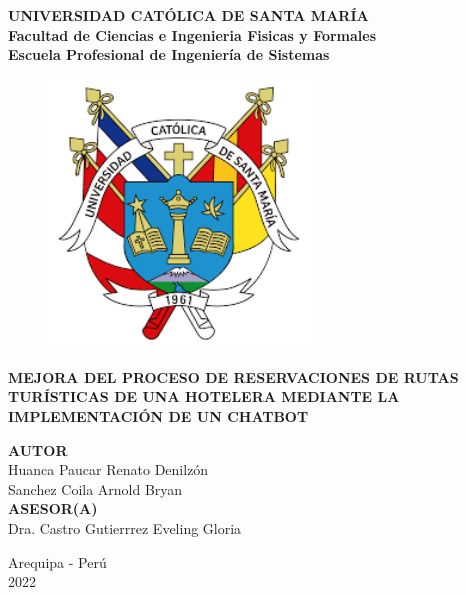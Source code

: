 \documentclass[12pt,a4paper,oneside]{article}
\begin{document}
\renewcommand{\BOthers}[1]{et al.\hbox{}}
\renewcommand\bibname{Bibliografía}

\marginsize{2.0cm}{2.0cm}{2.0cm}{2.0cm}

\begin{titlepage}
\begin{center}
 {\Large \bf UNIVERSIDAD CATÓLICA DE SANTA MARÍA}\\
  \vspace{8mm} 
  {\Large \bf Facultad de Ciencias e Ingenieria Fisicas y Formales}\\
  \vspace{8mm}
  {\Large \bf Escuela Profesional de Ingeniería de Sistemas}\\
 \begin{figure}[H]
    \centering
    \includegraphics[width=7cm]{Logo/logo de la catolica.png}
\end{figure}
\title{} %
{\Large \bf }
\vspace{1cm}
{\bf MEJORA DEL PROCESO DE RESERVACIONES DE RUTAS TURÍSTICAS DE UNA HOTELERA MEDIANTE LA IMPLEMENTACIÓN DE UN CHATBOT}\\[1.0cm]
\begin{flushright}
{\bf AUTOR}\\[0.5cm]
{Huanca Paucar Renato Denilzón}\\[0.5cm] %
{Sanchez Coila Arnold Bryan}\\[1.0cm]

{\bf ASESOR(A)}\\[0.5 cm] 
{Dra. Castro Gutierrrez Eveling Gloria}\\[0.5 cm] %
\end{flushright}
\vspace{1cm}
{Arequipa - Perú}\\[0.5cm]
{2022}
\end{center}
\end{titlepage}
\end{document}
